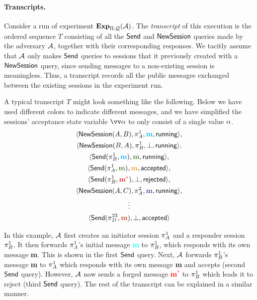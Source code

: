 \paragraph{Transcripts.}
Consider a run of experiment $\mathbf{Exp}_{\mathrm{\Pi},\mathcal{Q}}^{}(\mathcal{A})$.
The \emph{transcript} of this execution is the ordered sequence $T$ consisting of all the $\mathsf{Send}$ and $\mathsf{NewSession}$ queries made by the adversary $\mathcal{A}$,
together with their corresponding responses.
We tacitly assume that $\mathcal{A}$ only makes $\mathsf{Send}$ queries to sessions that it previously created with a $\mathsf{NewSession}$ query,
since sending messages to a non-existing session is meaningless.
Thus,
a transcript records all the public messages exchanged between the existing sessions in the experiment run. 

\begin{example}
A typical transcript $T$ might look something like the following.
Below we have used different colors to indicate different messages,
and we have simplified the sessions' acceptance state variable $\vrunstate$ to only consist of a single value $\alpha$.
\begin{gather*}
	\langle \NewSession(A, B),\oracle[A][1], \textcolor{Cyan}{\mathbf{m}}, \running \rangle, \\
	\langle \NewSession(B,A),\oracle[B][1], \bot, \running \rangle, \\
	\langle \Send(\oracle[B][1], \textcolor{Cyan}{\mathbf{m}}), \textcolor{OliveGreen}{\mathbf{m}}, \running \rangle, \\
	\langle \Send(\oracle[A][1], \textcolor{OliveGreen}{\mathbf{m}}), \textcolor{YellowOrange}{\mathbf{m}}, \accepted \rangle, \\
	\langle \Send(\oracle[B][1], \textcolor{Red}{\mathbf{m}^*}), \bot, \rejected \rangle, \\
	\langle \NewSession(A, C),\oracle[A][2], \textcolor{Violet}{\mathbf{m}}, \running \rangle, \\
								\vdots \\
	\langle \Send(\oracle[D][23], \textcolor{Bittersweet}{\mathbf{m}}), \bot, \accepted \rangle
\end{gather*}

In this example, $\mathcal{A}$ first creates an initiator session $\oracle[A][1]$ and a responder session $\oracle[B][1]$.
It then forwards $\oracle[A][1]$'s initial message \textcolor{Cyan}{\textbf{m}} to $\oracle[B][1]$,
which responds with its own message \textcolor{OliveGreen}{\textbf{m}}.
This is shown in the first $\mathsf{Send}$ query.
Next,
$\mathcal{A}$ forwards $\oracle[B][1]$'s message \textcolor{OliveGreen}{\textbf{m}} to $\oracle[A][1]$ which responds with its own message \textcolor{YellowOrange}{\textbf{m}} and accepts (second $\mathsf{Send}$ query).
However,
$\mathcal{A}$ now sends a forged message \textcolor{Red}{\textbf{m}$^*$} to $\oracle[B][1]$ which leads it to reject (third $\mathsf{Send}$ query).
The rest of the transcript can be explained in a similar manner.
\end{example}

